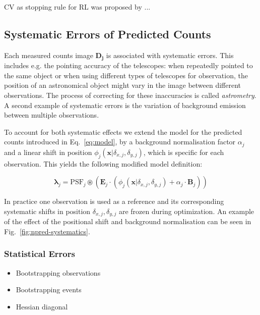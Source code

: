 \documentclass[twocolumn]{aastex631}
\begin{document}
    CV as stopping rule for RL was proposed by \cite{Reeves1995}...

    \subsection{Systematic Errors of Predicted Counts}
    Each measured counts image $\mathbf{D_j}$ is associated with systematic errors.
    This includes e.g. the pointing accuracy of the telescopes: when repeatedly pointed
    to the same object or when using different types of telescopes for observation, the
    position of an astronomical object might vary in the image between different
    observations. The process of correcting for these inaccuracies is called \textit{astrometry}.
    A second example of systematic errors is the variation of background emission
    between multiple observations.
    
    To account for both systematic effects we extend the model for the predicted
    counts introduced in Eq.~\ref{eq:model}, by a background normalisation factor
    $\alpha_j$ and a linear shift in position $\phi_j(\mathbf{x}| \delta_{x,j}, \delta_{y,j})$,
    which is specific for each observation. This yields the following modified model definition:
    
    \begin{equation}
        \label{eq:model-npred-calibration}
        \mathbf{\lambda}_j = \mathrm{PSF}_j \circledast \left(\mathbf{E}_j \cdot (\phi_j(\mathbf{x}| \delta_{x,j}, \delta_{y,j}) + \alpha_j \cdot \mathbf{B}_j) \right)
    \end{equation}
    
    In practice one observation is used as a reference and its corresponding
    systematic shifts in position $\delta_{x,j}, \delta_{y,j}$ are frozen during
    optimization. An example of the effect of the positional shift and background
    normalisation can be seen in Fig.~\ref{fig:npred-systematics}.

    \subsubsection{Statistical Errors}
    \begin{itemize}
        \item Bootstrapping observations
        \item Bootstrapping events
        \item Hessian diagonal
    \end{itemize}
    
\end{document}
